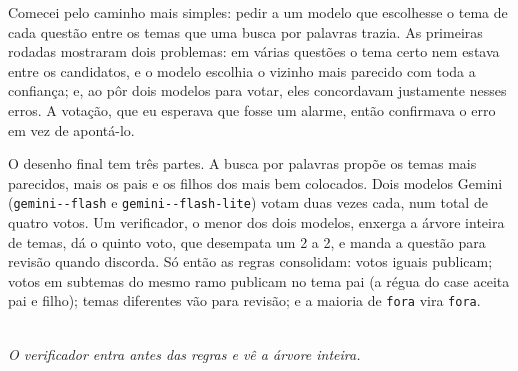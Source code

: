 \documentclass[11pt,a4paper]{article}
\begin{document}
Comecei pelo caminho mais simples: pedir a um modelo que escolhesse o tema de cada questão
entre os temas que uma busca por palavras trazia. As primeiras rodadas mostraram dois
problemas: em várias questões o tema certo nem estava entre os candidatos, e o
modelo escolhia o vizinho mais parecido com toda a confiança; e, ao pôr dois modelos para
votar, eles concordavam justamente nesses erros. A votação, que eu esperava que fosse um
alarme, então confirmava o erro em vez de apontá-lo.

O desenho final tem três partes. A busca por palavras propõe os temas mais parecidos, mais os
pais e os filhos dos mais bem colocados. Dois modelos Gemini (\texttt{gemini--\allowbreak flash} e
\texttt{gemini--\allowbreak flash-\allowbreak lite}) votam duas vezes cada, num total de quatro votos. Um
verificador, o menor dos dois modelos, enxerga a árvore inteira de temas, dá o quinto voto,
que desempata um 2 a 2, e manda a questão para revisão quando discorda. Só então as regras consolidam: votos iguais publicam; votos em
subtemas do mesmo ramo publicam no tema pai (a régua do case aceita pai e filho); temas
diferentes vão para revisão; e a maioria de \texttt{fora} vira \texttt{fora}.

\begin{tcolorbox}[colback=cinza,colframe=azul!30,boxrule=0.6pt,arc=2pt,
                  title={\small\bfseries\color{azul}ARQUITETURA DO PIPELINE DE CLASSIFICAÇÃO ENTREGUES},
                  coltitle=azul,colbacktitle=cinza,left=4pt,right=4pt,top=6pt,bottom=5pt]
\centering
{}
\\[2pt]
{\scriptsize\itshape\color{black!60}O verificador entra antes das regras e vê a árvore inteira.}
\end{tcolorbox}
\end{document}
